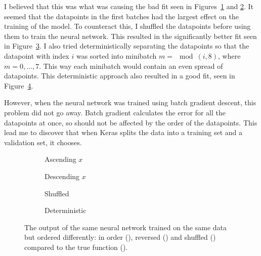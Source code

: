 I believed that this was what was causing the bad fit seen in Figures~\ref{fig:compare-order-ascending} and \ref{fig:compare-order-descending}.
It seemed that the datapoints in the first batches had the largest effect on the training of the model.
To counteract this, I shuffled the datapoints before using them to train the neural network.
This resulted in the significantly better fit seen in Figure~\ref{fig:compare-order-shuffled}.
I also tried deterministically separating the datapoints so that the datapoint with index \(i\) was sorted into minibatch \(m = \mod(i, 8)\), where \(m = 0, \dots, 7\).
This way each minibatch would contain an even spread of datapoints.
This deterministic approach also resulted in a good fit, seen in Figure~\ref{fig:compare-order-deterministic}.

However, when the neural network was trained using batch gradient descent, this problem did not go away.
Batch gradient calculates the error for all the datapoints at once, so should not be affected by the order of the datapoints.
This lead me to discover that when Keras splits the data into a training set and a validation set, it chooses. 

\begin{figure}[htbp]
	\vspace*{-3cm}
    \centering
    \begin{subfigure}[b]{\figwidth}
		
        \caption{Ascending \(x\)}
        \label{fig:compare-order-ascending}
	\end{subfigure}
    \begin{subfigure}[b]{\figwidth}
		
        \caption{Descending \(x\)}
        \label{fig:compare-order-descending}
	\end{subfigure}
	\begin{subfigure}[b]{\figwidth}
		
        \caption{Shuffled}
        \label{fig:compare-order-shuffled}
	\end{subfigure}
	\begin{subfigure}[b]{\figwidth}
		
        \caption{Deterministic}
        \label{fig:compare-order-deterministic}
	\end{subfigure}
	\caption{The output of the same neural network trained on the same data but ordered differently: in order (\inordercolour), reversed (\reversedcolour) and shuffled (\shuffledcolour) compared to the true function (\truthcolour).}
	\label{fig:compare-order}
\end{figure}

